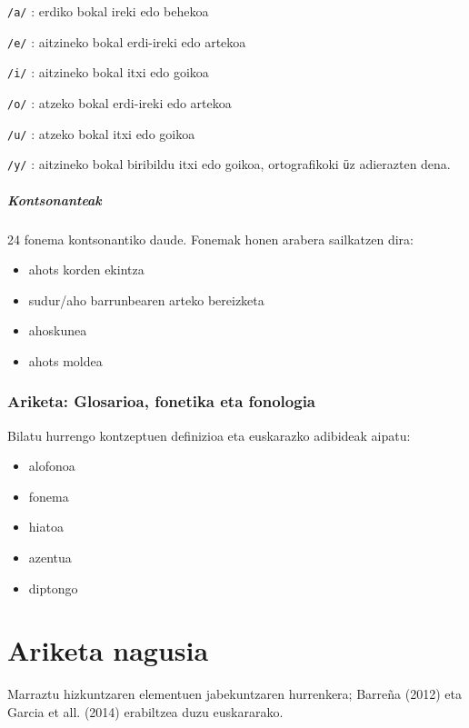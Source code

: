 \documentclass[
]{book}
\providecommand{\tightlist}{%
  \setlength{\itemsep}{0pt}\setlength{\parskip}{0pt}}
\begin{document}
\texttt{/a/}
: erdiko bokal ireki edo behekoa

\texttt{/e/}
: aitzineko bokal erdi-ireki edo artekoa

\texttt{/i/}
: aitzineko bokal itxi edo goikoa

\texttt{/o/}
: atzeko bokal erdi-ireki edo artekoa

\texttt{/u/}
: atzeko bokal itxi edo goikoa

\texttt{/y/}
: aitzineko bokal biribildu itxi edo goikoa, ortografikoki \texttt{ü}z adierazten dena.

\hypertarget{kontsonanteak}{%
\subparagraph{Kontsonanteak}\label{kontsonanteak}}

24 fonema kontsonantiko daude. Fonemak honen arabera sailkatzen dira:

\begin{itemize}
\tightlist
\item
  ahots korden ekintza
\item
  sudur/aho barrunbearen arteko bereizketa
\item
  ahoskunea
\item
  ahots moldea
\end{itemize}

\hypertarget{T2A3}{%
\subsubsection*{Ariketa: Glosarioa, fonetika eta fonologia}\label{T2A3}}

Bilatu hurrengo kontzeptuen definizioa eta euskarazko adibideak aipatu:

\begin{itemize}
\tightlist
\item
  alofonoa
\item
  fonema
\item
  hiatoa
\item
  azentua
\item
  diptongo
\end{itemize}

\hypertarget{T2A4}{%
\section*{Ariketa nagusia}\label{T2A4}}

Marraztu hizkuntzaren elementuen jabekuntzaren hurrenkera; Barreña (2012) eta Garcia et all. (2014) erabiltzea duzu euskararako.
\end{document}
